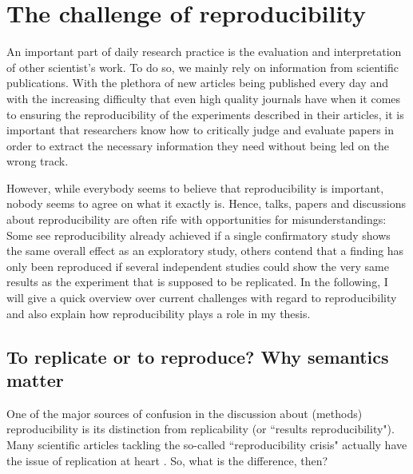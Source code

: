 \documentclass[11pt, a4paper,twoside]{report}\usepackage[]{graphicx}\usepackage[]{color}
\begin{document}
\chapter{The challenge of reproducibility}
\label{ch:reproducibility}
An important part of daily research practice is the evaluation and interpretation of other scientist's work. To do so, we mainly rely on information from scientific publications. With the plethora of new articles being published every day and with the increasing difficulty that even high quality journals have when it comes to ensuring the reproducibility of the experiments described in their articles, it is important that researchers know how to critically judge and evaluate papers in order to extract the necessary information they need without being led on the wrong track. 

However, while everybody seems to believe that reproducibility is important, nobody seems to agree on what it exactly is. Hence, talks, papers and discussions about reproducibility are often rife with opportunities for misunderstandings: Some see reproducibility already achieved if a single confirmatory study shows the same overall effect as an exploratory study, others contend that a finding has only been reproduced if several independent studies could show the very same results as the experiment that is supposed to be replicated. In the following, I will give a quick overview over current challenges with regard to reproducibility and also explain how reproducibility plays a role in my thesis. 

\section[To replicate or to reproduce?]{To replicate or to reproduce? Why semantics matter}
\label{sec:replicate}
One of the major sources of confusion in the discussion about (methods) reproducibility is its distinction from replicability (or ``results reproducibility"). Many scientific articles tackling the so-called ``reproducibility crisis" \citep{casadevall_reproducible_2010,prinz_believe_2011,begley2012drug,begley_six_2013,begley2015reproducibility,freedman_economics_2015,aarts2015estimating,baker2016there,baker2016reproducibility,crotty_reproducible_2017,nosek_reproducibility_2017} actually have the issue of replication at heart \citep{schooler2014metascience,stroebe_alleged_2014,kullmann2015biomedicine,maxwell_is_2015,earp_replication_2015,camerer_evaluating_2016,loken_measurement_2017}. So, what is the difference, then?
\end{document}
